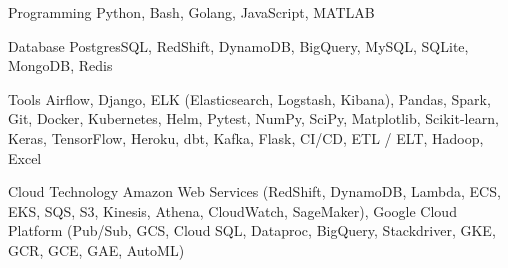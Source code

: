 

\begin{cvskills}

  \cvskill
    {Programming} %
    {Python, Bash, Golang, JavaScript, MATLAB} %

  \cvskill
    {Database} %
    {PostgresSQL, RedShift, DynamoDB, BigQuery, MySQL, SQLite, MongoDB, Redis} %

  \cvskill
    {Tools} %
    {Airflow, Django, ELK (Elasticsearch, Logstash, Kibana), Pandas, Spark, Git, Docker, Kubernetes, Helm, Pytest, NumPy, SciPy, Matplotlib, Scikit-learn, Keras, TensorFlow, Heroku, dbt, Kafka, Flask, CI/CD, ETL / ELT, Hadoop, Excel} %






  \cvskill
    {Cloud Technology} %
    {Amazon Web Services (RedShift, DynamoDB, Lambda, ECS, EKS, SQS, S3, Kinesis, Athena, CloudWatch, SageMaker),
    Google Cloud Platform (Pub/Sub, GCS, Cloud SQL, Dataproc, BigQuery, Stackdriver, GKE, GCR, GCE, GAE, AutoML)} 


\end{cvskills}
